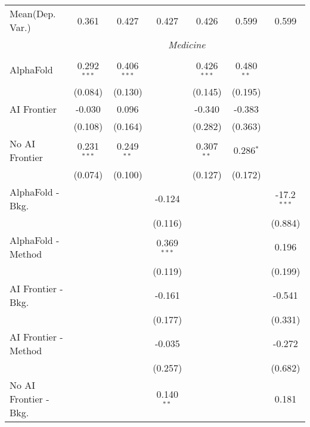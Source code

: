 \begin{tabular}{lcccccc}
Mean(Dep. Var.) & 0.361 & 0.427 & 0.427 & 0.426 & 0.599 & 0.599 \\
 & \multicolumn{6}{c}{\textit{Medicine}} \\ \\
   AlphaFold               & 0.292$^{***}$ & 0.406$^{***}$ &               & 0.426$^{***}$ & 0.480$^{**}$ &   \\   
                           & (0.084)       & (0.130)       &               & (0.145)       & (0.195)      &   \\   
   AI Frontier             & -0.030        & 0.096         &               & -0.340        & -0.383       &   \\   
                           & (0.108)       & (0.164)       &               & (0.282)       & (0.363)      &   \\   
   No AI Frontier          & 0.231$^{***}$ & 0.249$^{**}$  &               & 0.307$^{**}$  & 0.286$^{*}$  &   \\   
                           & (0.074)       & (0.100)       &               & (0.127)       & (0.172)      &   \\   
   AlphaFold - Bkg.        &               &               & -0.124        &               &              & -17.2$^{***}$\\   
                           &               &               & (0.116)       &               &              & (0.884)\\   
   AlphaFold - Method      &               &               & 0.369$^{***}$ &               &              & 0.196\\   
                           &               &               & (0.119)       &               &              & (0.199)\\   
   AI Frontier - Bkg.      &               &               & -0.161        &               &              & -0.541\\   
                           &               &               & (0.177)       &               &              & (0.331)\\   
   AI Frontier - Method    &               &               & -0.035        &               &              & -0.272\\   
                           &               &               & (0.257)       &               &              & (0.682)\\   
   No AI Frontier - Bkg.   &               &               & 0.140$^{**}$  &               &              & 0.181\\   

\end{tabular}
